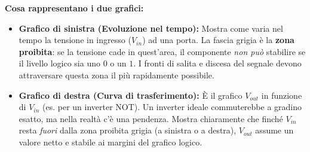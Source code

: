 \documentclass[11pt,a4paper]{report}
\begin{document}
\begin{center}
\qquad
{}
\end{center}

\noindent\textbf{Cosa rappresentano i due grafici:}
\begin{itemize}[leftmargin=1.5em]
    \item \textbf{Grafico di sinistra (Evoluzione nel tempo):} Mostra come varia nel tempo la tensione in ingresso ($V_{in}$) ad una porta. La fascia grigia è la \textbf{zona proibita}: se la tensione cade in quest'area, il componente \emph{non può} stabilire se il livello logico sia uno $0$ o un $1$. I fronti di salita e discesa del segnale devono attraversare questa zona il più rapidamente possibile.
    \item \textbf{Grafico di destra (Curva di trasferimento):} È il grafico $V_{out}$ in funzione di $V_{in}$ (es. per un inverter NOT). Un inverter ideale commuterebbe a gradino esatto, ma nella realtà c'è una pendenza. Mostra chiaramente che finché $V_{in}$ resta \emph{fuori} dalla zona proibita grigia (a sinistra o a destra), $V_{out}$ assume un valore netto e stabile ai margini del grafico logico.
\end{itemize}
\end{document}
